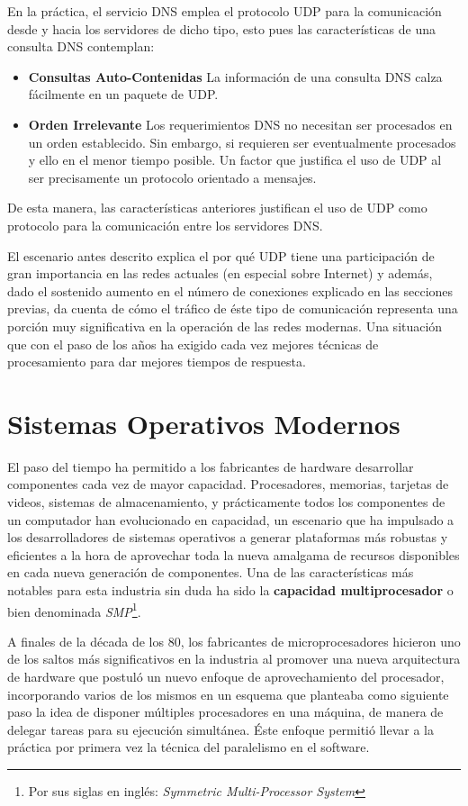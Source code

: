 En la práctica, el servicio DNS emplea el protocolo UDP para la comunicación desde y hacia los servidores de dicho tipo, esto pues las características de una consulta DNS contemplan:

\begin{itemize}
\item \textbf{Consultas Auto-Contenidas} La información de una consulta DNS calza fácilmente en un paquete de UDP.
\item \textbf{Orden Irrelevante} Los requerimientos DNS no necesitan ser procesados en un orden establecido. Sin embargo, si requieren ser eventualmente procesados y ello en el menor tiempo posible. Un factor que justifica el uso de UDP al ser precisamente un protocolo orientado a mensajes.
\end{itemize}

De esta manera, las características anteriores justifican el uso de UDP como protocolo para la comunicación entre los servidores DNS.

El escenario antes descrito explica el por qué UDP tiene una participación de gran importancia en las redes actuales (en especial sobre Internet) y además, dado el sostenido aumento en el número de conexiones explicado en las secciones previas, da cuenta de cómo el tráfico de éste tipo de comunicación representa una porción muy significativa en la operación de las redes modernas. Una situación que con el paso de los años ha exigido cada vez mejores técnicas de procesamiento para dar mejores tiempos de respuesta.

\section{Sistemas Operativos Modernos}
El paso del tiempo ha permitido a los fabricantes de hardware desarrollar componentes cada vez de mayor capacidad. Procesadores, memorias, tarjetas de videos, sistemas de almacenamiento, y prácticamente todos los componentes de un computador han evolucionado en capacidad, un escenario que ha impulsado a los desarrolladores de sistemas operativos a generar plataformas más robustas y eficientes a la hora de aprovechar toda la nueva amalgama de recursos disponibles en cada nueva generación de componentes. Una de las características más notables para esta industria sin duda ha sido la \textbf{capacidad multiprocesador} o bien denominada \emph{SMP}\footnote{Por sus siglas en inglés: \textit{Symmetric Multi-Processor System}}.

A finales de la década de los 80, los fabricantes de microprocesadores hicieron uno de los saltos más significativos en la industria al promover una nueva arquitectura de hardware que postuló un nuevo enfoque de aprovechamiento del procesador, incorporando varios de los mismos en un esquema que planteaba como siguiente paso la idea de disponer múltiples procesadores en una máquina, de manera de delegar tareas para su ejecución simultánea. Éste enfoque permitió llevar a la práctica por primera vez la técnica del paralelismo en el software.


